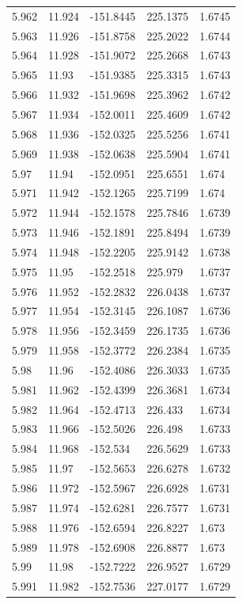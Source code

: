 \begin{tabular}{lllll}
5.962 & 11.924 & -151.8445 & 225.1375 & 1.6745 \\
5.963 & 11.926 & -151.8758 & 225.2022 & 1.6744 \\
5.964 & 11.928 & -151.9072 & 225.2668 & 1.6743 \\
5.965 & 11.93 & -151.9385 & 225.3315 & 1.6743 \\
5.966 & 11.932 & -151.9698 & 225.3962 & 1.6742 \\
5.967 & 11.934 & -152.0011 & 225.4609 & 1.6742 \\
5.968 & 11.936 & -152.0325 & 225.5256 & 1.6741 \\
5.969 & 11.938 & -152.0638 & 225.5904 & 1.6741 \\
5.97 & 11.94 & -152.0951 & 225.6551 & 1.674 \\
5.971 & 11.942 & -152.1265 & 225.7199 & 1.674 \\
5.972 & 11.944 & -152.1578 & 225.7846 & 1.6739 \\
5.973 & 11.946 & -152.1891 & 225.8494 & 1.6739 \\
5.974 & 11.948 & -152.2205 & 225.9142 & 1.6738 \\
5.975 & 11.95 & -152.2518 & 225.979 & 1.6737 \\
5.976 & 11.952 & -152.2832 & 226.0438 & 1.6737 \\
5.977 & 11.954 & -152.3145 & 226.1087 & 1.6736 \\
5.978 & 11.956 & -152.3459 & 226.1735 & 1.6736 \\
5.979 & 11.958 & -152.3772 & 226.2384 & 1.6735 \\
5.98 & 11.96 & -152.4086 & 226.3033 & 1.6735 \\
5.981 & 11.962 & -152.4399 & 226.3681 & 1.6734 \\
5.982 & 11.964 & -152.4713 & 226.433 & 1.6734 \\
5.983 & 11.966 & -152.5026 & 226.498 & 1.6733 \\
5.984 & 11.968 & -152.534 & 226.5629 & 1.6733 \\
5.985 & 11.97 & -152.5653 & 226.6278 & 1.6732 \\
5.986 & 11.972 & -152.5967 & 226.6928 & 1.6731 \\
5.987 & 11.974 & -152.6281 & 226.7577 & 1.6731 \\
5.988 & 11.976 & -152.6594 & 226.8227 & 1.673 \\
5.989 & 11.978 & -152.6908 & 226.8877 & 1.673 \\
5.99 & 11.98 & -152.7222 & 226.9527 & 1.6729 \\
5.991 & 11.982 & -152.7536 & 227.0177 & 1.6729 \\

\end{tabular}
